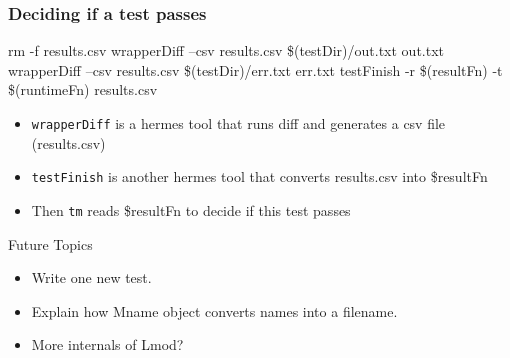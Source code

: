 \documentclass{beamer}
\begin{document}
\begin{frame}[fragile]
  \frametitle{Deciding if a test passes}
    {\tiny
\begin{semiverbatim}
rm -f results.csv
wrapperDiff --csv results.csv \$(testDir)/out.txt out.txt
wrapperDiff --csv results.csv \$(testDir)/err.txt err.txt
testFinish -r \$(resultFn) -t \$(runtimeFn) results.csv
\end{semiverbatim}
    }
    \begin{itemize}
      \item \texttt{wrapperDiff} is a hermes tool that runs diff and
        generates a csv file (results.csv)
      \item \texttt{testFinish} is another hermes tool that converts
        results.csv into \$resultFn
      \item Then \texttt{tm} reads \$resultFn to decide if this test passes
    \end{itemize}
\end{frame}




\begin{frame}{Future Topics}
  \begin{itemize}
    \item Write one new test.
    \item Explain how Mname object converts names into a filename.
    \item More internals of Lmod?
  \end{itemize}
\end{frame}
\end{document}
